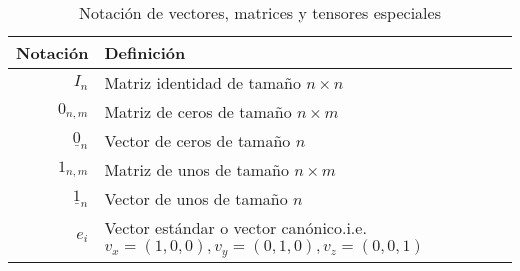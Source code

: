\begin{table}[H]
    \begin{center}
        \begin{tabularx}{\textwidth}{|r|X|}
            \hline
            \textbf{Notación}     & \textbf{Definición}                                                                                                  \\
            \hline

            $ I_{n} $             & Matriz identidad de tamaño $ n \times n $                                                                            \\
            $ 0_{n,m} $           & Matriz de ceros de tamaño $ n \times m $                                                                             \\
            $ \underline{0}_{n} $ & Vector de ceros de tamaño $ n $                                                                                      \\
            $ 1_{n,m} $           & Matriz de unos de tamaño $ n \times m $                                                                              \\
            $ \underline{1}_{n} $ & Vector de unos de tamaño $n $                                                                                        \\
            $ e_{i} $             & Vector estándar o vector canónico.\newline i.e. \scriptsize{${ v_{x} = (1,0,0), v_{y} = (0,1,0), v_{z} = (0,0,1)} $} \\
            \hline
        \end{tabularx}
        \caption{Notación de vectores, matrices y tensores especiales}
        \label{tab:notation-part-v-2}
    \end{center}
\end{table}



